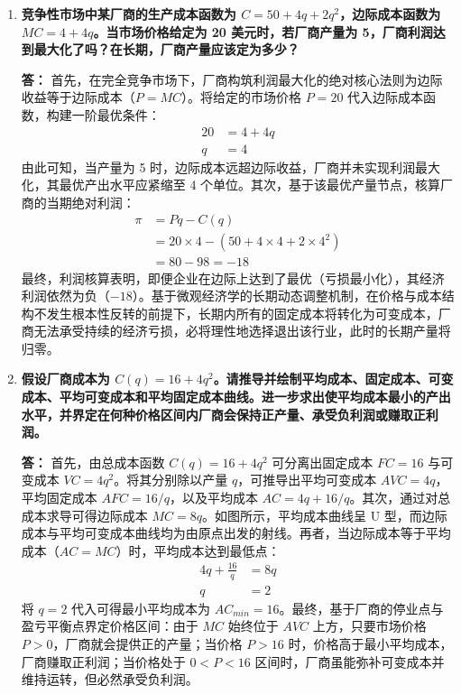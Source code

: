 \begin{enumerate}[label=\textbf{\arabic*.}, leftmargin=*]
		\item \textbf{竞争性市场中某厂商的生产成本函数为 $C = 50 + 4q + 2q^2$，边际成本函数为 $MC = 4 + 4q$。当市场价格给定为 20 美元时，若厂商产量为 5，厂商利润达到最大化了吗？在长期，厂商产量应该定为多少？}
		
		\textbf{答：}
		首先，在完全竞争市场下，厂商构筑利润最大化的绝对核心法则为边际收益等于边际成本（$P = MC$）。将给定的市场价格 $P=20$ 代入边际成本函数，构建一阶最优条件：
		\[
		\begin{aligned}
			20 &= 4 + 4q \\
			q &= 4
		\end{aligned}
		\]
		由此可知，当产量为 5 时，边际成本远超边际收益，厂商并未实现利润最大化，其最优产出水平应紧缩至 4 个单位。其次，基于该最优产量节点，核算厂商的当期绝对利润：
		\[
		\begin{aligned}
			\pi &= P q - C(q) \\
			&= 20 \times 4 - \left(50 + 4 \times 4 + 2 \times 4^{2}\right) \\
			&= 80 - 98 = -18
		\end{aligned}
		\]
		最终，利润核算表明，即便企业在边际上达到了最优（亏损最小化），其经济利润依然为负（$-18$）。基于微观经济学的长期动态调整机制，在价格与成本结构不发生根本性反转的前提下，长期内所有的固定成本将转化为可变成本，厂商无法承受持续的经济亏损，必将理性地选择退出该行业，此时的长期产量将归零。
		
		\item \textbf{假设厂商成本为 $C(q) = 16 + 4q^2$。请推导并绘制平均成本、固定成本、可变成本、平均可变成本和平均固定成本曲线。进一步求出使平均成本最小的产出水平，并界定在何种价格区间内厂商会保持正产量、承受负利润或赚取正利润。}
		
		\textbf{答：}
		首先，由总成本函数 $C(q) = 16 + 4q^2$ 可分离出固定成本 $FC = 16$ 与可变成本 $VC = 4q^2$。将其分别除以产量 $q$，可推导出平均可变成本 $AVC = 4q$，平均固定成本 $AFC = 16/q$，以及平均成本 $AC = 4q + 16/q$。其次，通过对总成本求导可得边际成本 $MC = 8q$。如图所示，平均成本曲线呈 U 型，而边际成本与平均可变成本曲线均为由原点出发的射线。再者，当边际成本等于平均成本（$AC = MC$）时，平均成本达到最低点：
		\[
		\begin{aligned}
			4q + \frac{16}{q} &= 8q \\
			q &= 2
		\end{aligned}
		\]
		将 $q = 2$ 代入可得最小平均成本为 $AC_{min} = 16$。最终，基于厂商的停业点与盈亏平衡点界定价格区间：由于 $MC$ 始终位于 $AVC$ 上方，只要市场价格 $P > 0$，厂商就会提供正的产量；当价格 $P > 16$ 时，价格高于最小平均成本，厂商赚取正利润；当价格处于 $0 < P < 16$ 区间时，厂商虽能弥补可变成本并维持运转，但必然承受负利润。
		

\end{enumerate}
